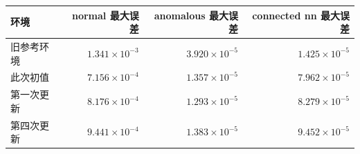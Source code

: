 \begin{tabular}{lrrr}
\toprule
环境 & normal 最大误差 & anomalous 最大误差 & connected nn 最大误差 \\
\midrule
旧参考环境 & $1.341\times10^{-3}$ & $3.920\times10^{-5}$ & $1.425\times10^{-5}$ \\
此次初值 & $7.156\times10^{-4}$ & $1.357\times10^{-5}$ & $7.962\times10^{-5}$ \\
第一次更新 & $8.176\times10^{-4}$ & $1.293\times10^{-5}$ & $8.279\times10^{-5}$ \\
第四次更新 & $9.441\times10^{-4}$ & $1.383\times10^{-5}$ & $9.452\times10^{-5}$ \\
\bottomrule
\end{tabular}
